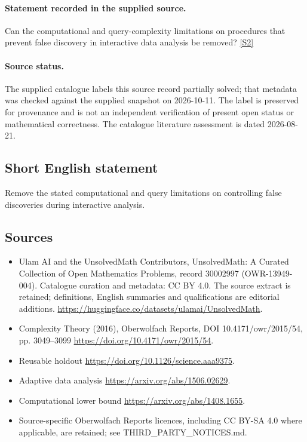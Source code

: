 \documentclass[11pt]{article}
\begin{document}
\paragraph{Statement recorded in the supplied source.}
Can the computational and query-complexity limitations on procedures that prevent false discovery in interactive data analysis be removed? \href{https://doi.org/10.4171/owr/2015/54}{[S2]}
\paragraph{Source status.}
The supplied catalogue labels this source record partially solved; that metadata was checked against the supplied snapshot on 2026-10-11. The label is preserved for provenance and is not an independent verification of present open status or mathematical correctness. The catalogue literature assessment is dated 2026-08-21.
\subsection{Short English statement}
Remove the stated computational and query limitations on controlling false discoveries during interactive analysis.
\subsection{Sources}
\begin{itemize}
\item[S1] Ulam AI and the UnsolvedMath Contributors, UnsolvedMath: A Curated Collection of Open Mathematics Problems, record 30002997 (OWR-13949-004). Catalogue curation and metadata: CC BY 4.0. The source extract is retained; definitions, English summaries and qualifications are editorial additions.
\url{https://huggingface.co/datasets/ulamai/UnsolvedMath}.
\item[S2] Complexity Theory (2016), Oberwolfach Reports, DOI 10.4171/owr/2015/54, pp. 3049--3099
\url{https://doi.org/10.4171/owr/2015/54}.
\item[S3] Reusable holdout
\url{https://doi.org/10.1126/science.aaa9375}.
\item[S4] Adaptive data analysis
\url{https://arxiv.org/abs/1506.02629}.
\item[S5] Computational lower bound
\url{https://arxiv.org/abs/1408.1655}.
\item Source-specific Oberwolfach Reports licences, including CC BY-SA 4.0 where applicable, are retained; see THIRD\_PARTY\_NOTICES.md.
\end{itemize}
\end{document}
